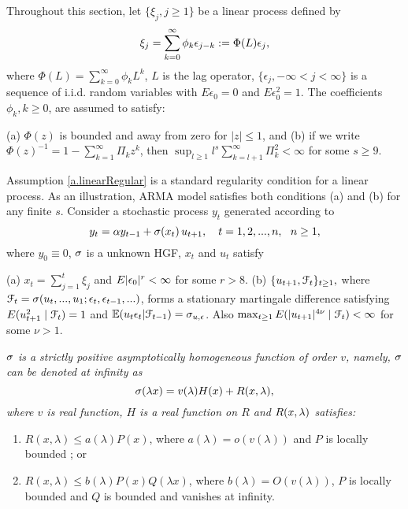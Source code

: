 Throughout this section, let $\{\xi_{j},j\geq 1\}$ be a linear process defined by
 $$\xi_j=\sum_{k=0}^{\infty}\phi_k\epsilon_{j-k}:= \Phi(L)\epsilon_j,$$
 where $\Phi(L) = \sum_{k = 0}^{\infty} \phi_k L^k$, $L$ is the lag operator,
 $\{\epsilon _{j},-\infty <j<\infty \}$ is a sequence of i.i.d.
random variables with $E\epsilon _{0}=0$ and $E\epsilon _{0}^{2}=1$. The coefficients $%
\phi _{k},k\geq 0$, are assumed to satisfy:
\begin{assump}
(a) $\Phi(z)$ is bounded and away from zero for $|z| \le 1$, and
(b) if we write $\Phi(z)^{-1} = 1 - \sum_{k = 1}^{\infty} \Pi_k z^k$, then $\sup_{l\ge 1}l^s \sum_{k = l+1}^{\infty} \Pi_k^2 < \infty$ for some $s \ge 9$.
\end{assump}
Assumption \ref{a.linearRegular} is  a standard regularity condition for a linear process. As an illustration,  ARMA model satisfies both conditions (a) and (b) for any finite $s$. Consider a stochastic process  $y_{t}$  generated according to
\begin{equation} \la{eqn41}
y_{t}=\al y_{t-1}+\si(x_{t})\,u_{t+1}, \quad t=1,2,...,n,\ \ n\ge 1,
\end{equation}
where $y_{0}\equiv 0$, $\sigma$ is a unknown HGF, $x_t$ and $u_t$ satisfy
 \begin{assump}  (a) $x_t=\sum_{j=1}^t\xi_j$ and $E|\epsilon_0|^r<\infty$ for some $r>8$. (b) $\{u_{t+1}, {\cal F}_t\}_{t\ge 1},$ where ${\cal F}_t=\sigma(u_{t},..., u_1; \epsilon_t,\epsilon_{t-1},... )$, forms a stationary martingale difference satisfying $E(u_{t+1}^2\mid {\cal F}_t)=1$ and $\mathbb E(u_t\epsilon_t | \mathcal F_{t -1}) = \sigma_{u, \epsilon}$. Also $\max_{t\ge 1}E(|u_{t+1}|^{4\nu}\mid {\cal F}_t)<\infty$ for some $\nu>1$.
\end{assump}

\begin{assump}  {\it  $\sigma$ is a strictly positive asymptotically homogeneous function of order $v$,
namely, $\sigma$ can be denoted at infinity as
\begin{equation}
\sigma(\lambda x) = v(\lambda)H(x) + R(x,\lambda),
\end{equation}
where $v$ is real function, $H$ is a real function on $R$ and $R(x, \lambda)$ satisfies:
\begin{enumerate}
\item $R(x,\lambda) \le a(\lambda)P(x)$, where $a(\lambda) = o( v(\lambda) )$ and $P$ is locally bounded ; or
\item $R(x, \lambda) \le b(\lambda)P(x)Q(\lambda x)$, where $b(\lambda) = O(v(\lambda))$, $P$ is locally bounded and $Q$ is bounded and vanishes at infinity.
\end{enumerate}
}
\end{assump}


